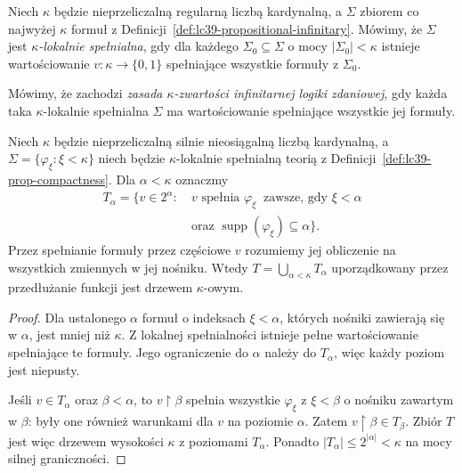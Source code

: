 \begin{definicja}
\label{def:lc39-prop-compactness}
Niech $\kappa$ będzie nieprzeliczalną
regularną liczbą kardynalną,
a $\Sigma$ zbiorem co najwyżej
$\kappa$ formuł z
Definicji~\ref{def:lc39-propositional-infinitary}.
Mówimy, że $\Sigma$ jest
\emph{$\kappa$-lokalnie spełnialna},
gdy dla każdego
$\Sigma_0\subseteq\Sigma$
o mocy $|\Sigma_0|<\kappa$
istnieje wartościowanie
$v:\kappa\to\{0,1\}$
spełniające wszystkie
formuły z $\Sigma_0$.

Mówimy, że zachodzi
\emph{zasada $\kappa$-zwartości
infinitarnej logiki zdaniowej},
gdy każda taka
$\kappa$-lokalnie spełnialna
$\Sigma$ ma wartościowanie
spełniające wszystkie
jej formuły.
\end{definicja}

\begin{lemat}
\label{lem:lc39-valuations-tree}
Niech $\kappa$ będzie nieprzeliczalną
silnie nieosiągalną liczbą
kardynalną, a
$\Sigma=\{\varphi_\xi:\xi<\kappa\}$
niech będzie
$\kappa$-lokalnie spełnialną
teorią z Definicji~\ref{def:lc39-prop-compactness}.
Dla $\alpha<\kappa$ oznaczmy
\[
 \begin{aligned}
 T_\alpha=\{v\in2^\alpha:\ 
 &v\text{ spełnia }\varphi_\xi\
   \text{ zawsze, gdy }\xi<\alpha\\
 &\text{oraz }
   \operatorname{supp}(\varphi_\xi)
                           \subseteq\alpha\}.
 \end{aligned}
\]
Przez spełnianie formuły
przez częściowe $v$
rozumiemy jej obliczenie
na wszystkich zmiennych
w jej nośniku.
Wtedy
$T=\bigcup_{\alpha<\kappa}T_\alpha$
uporządkowany przez
przedłużanie funkcji
jest drzewem $\kappa$-owym.
\end{lemat}
\begin{proof}
Dla ustalonego $\alpha$
formuł o indeksach $\xi<\alpha$,
których nośniki zawierają się
w $\alpha$, jest mniej niż $\kappa$.
Z lokalnej spełnialności
istnieje pełne wartościowanie
spełniające te formuły.
Jego ograniczenie do $\alpha$
należy do $T_\alpha$,
więc każdy poziom jest niepusty.

Jeśli $v\in T_\alpha$
oraz $\beta<\alpha$,
to $v\restriction\beta$
spełnia wszystkie
$\varphi_\xi$ z $\xi<\beta$
o nośniku zawartym w $\beta$:
były one również warunkami
dla $v$ na poziomie $\alpha$.
Zatem $v\restriction\beta
\in T_\beta$.
Zbiór $T$ jest więc drzewem
wysokości $\kappa$ z
poziomami $T_\alpha$.
Ponadto
$|T_\alpha|
 \le 2^{|\alpha|}<\kappa$
na mocy silnej graniczności.
\end{proof}

